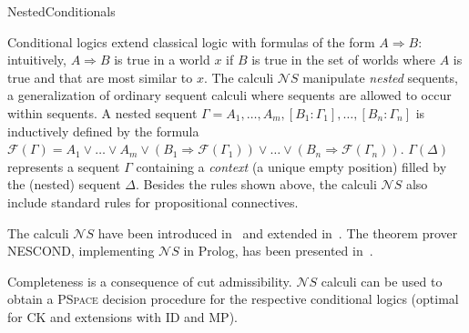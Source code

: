 \begin{entry}{NestedConditionals}
\begin{clarifications}
  Conditional logics extend classical logic with formulas of the form $A
  \Rightarrow B$: intuitively, $A \Rightarrow B$ is true in a world $x$ if $B$ is
  true in the set of worlds where $A$ is true and that are most similar to $x$.
  The calculi $\mathcal{N}S$ manipulate \emph{nested} sequents, a generalization
  of ordinary sequent calculi where sequents are allowed to occur within sequents.
  A nested sequent $\Gamma = A_1, \dots, A_m, [B_1: \Gamma_1], \dots, [B_n:
  \Gamma_n]$ is inductively defined by the formula $\mathcal{F}(\Gamma)=A_1 \vee
  \dots \vee A_m \vee (B_1 \Rightarrow \mathcal{F}(\Gamma_1)) \vee \dots \vee (B_n
  \Rightarrow \mathcal{F}(\Gamma_n)).$ $\Gamma(\Delta)$ represents a sequent
  $\Gamma$ containing a \emph{context} (a unique empty position) filled by the
  (nested) sequent $\Delta$.  Besides the rules shown above, the calculi
  $\mathcal{N}S$ also include standard rules for propositional connectives.
\end{clarifications}

\begin{history}
  The calculi $\mathcal{N}S$ have been introduced in~\cite{jelia2012pozz} and
  extended  in~\cite{jlcpozz}. The theorem prover NESCOND, implementing
  $\mathcal{N}S$ in Prolog, has been presented in~\cite{ijcarpozz}.
\end{history}

\begin{technicalities}
  Completeness is a consequence of cut admissibility. $\mathcal{N}S$ calculi  can
  be used to obtain a \textsc{PSpace} decision procedure for the respective
  conditional logics (optimal for CK and extensions with ID and MP).
\end{technicalities}













\end{entry}

